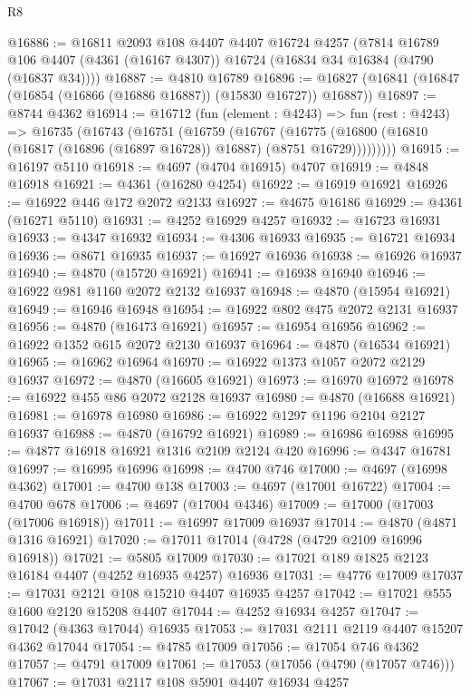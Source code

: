 \begin{lexlean}{R8}
\begin{coremodule}
@16886 := @16811
    @2093
    @108
    @4407
    @4407
    @16724
    @4257
    (@7814 @16789 @106 @4407 (@4361 (@16167 @4307)) @16724 (@16834 @34 @16384 (@4790 (@16837 @34))))
@16887 := @4810 @16789
@16896 := @16827 (@16841 (@16847 (@16854 (@16866 (@16886 @16887)) (@15830 @16727)) @16887))
@16897 := @8744 @4362
@16914 := @16712
    (fun (element : @4243) =>
    fun (rest : @4243) =>
    @16735
      (@16743
        (@16751
          (@16759
            (@16767
              (@16775
                (@16800 (@16810 (@16817 (@16896 (@16897 @16728)) @16887) (@8751 @16729)))))))))
@16915 := @16197 @5110
@16918 := @4697 (@4704 @16915) @4707
@16919 := @4848 @16918
@16921 := @4361 (@16280 @4254)
@16922 := @16919 @16921
@16926 := @16922 @446 @172 @2072 @2133
@16927 := @4675 @16186
@16929 := @4361 (@16271 @5110)
@16931 := @4252 @16929 @4257
@16932 := @16723 @16931
@16933 := @4347 @16932
@16934 := @4306 @16933
@16935 := @16721 @16934
@16936 := @8671 @16935
@16937 := @16927 @16936
@16938 := @16926 @16937
@16940 := @4870 (@15720 @16921)
@16941 := @16938 @16940
@16946 := @16922 @981 @1160 @2072 @2132 @16937
@16948 := @4870 (@15954 @16921)
@16949 := @16946 @16948
@16954 := @16922 @802 @475 @2072 @2131 @16937
@16956 := @4870 (@16473 @16921)
@16957 := @16954 @16956
@16962 := @16922 @1352 @615 @2072 @2130 @16937
@16964 := @4870 (@16534 @16921)
@16965 := @16962 @16964
@16970 := @16922 @1373 @1057 @2072 @2129 @16937
@16972 := @4870 (@16605 @16921)
@16973 := @16970 @16972
@16978 := @16922 @455 @86 @2072 @2128 @16937
@16980 := @4870 (@16688 @16921)
@16981 := @16978 @16980
@16986 := @16922 @1297 @1196 @2104 @2127 @16937
@16988 := @4870 (@16792 @16921)
@16989 := @16986 @16988
@16995 := @4877 @16918 @16921 @1316 @2109 @2124 @420
@16996 := @4347 @16781
@16997 := @16995 @16996
@16998 := @4700 @746
@17000 := @4697 (@16998 @4362)
@17001 := @4700 @138
@17003 := @4697 (@17001 @16722)
@17004 := @4700 @678
@17006 := @4697 (@17004 @4346)
@17009 := @17000 (@17003 (@17006 @16918))
@17011 := @16997 @17009 @16937
@17014 := @4870 (@4871 @1316 @16921)
@17020 := @17011 @17014 (@4728 (@4729 @2109 @16996 @16918))
@17021 := @5805 @17009
@17030 := @17021 @189 @1825 @2123 @16184 @4407 (@4252 @16935 @4257) @16936
@17031 := @4776 @17009
@17037 := @17031 @2121 @108 @15210 @4407 @16935 @4257
@17042 := @17021 @555 @1600 @2120 @15208 @4407
@17044 := @4252 @16934 @4257
@17047 := @17042 (@4363 @17044) @16935
@17053 := @17031 @2111 @2119 @4407 @15207 @4362 @17044
@17054 := @4785 @17009
@17056 := @17054 @746 @4362
@17057 := @4791 @17009
@17061 := @17053 (@17056 (@4790 (@17057 @746)))
@17067 := @17031 @2117 @108 @5901 @4407 @16934 @4257

\end{coremodule}
\end{lexlean}
